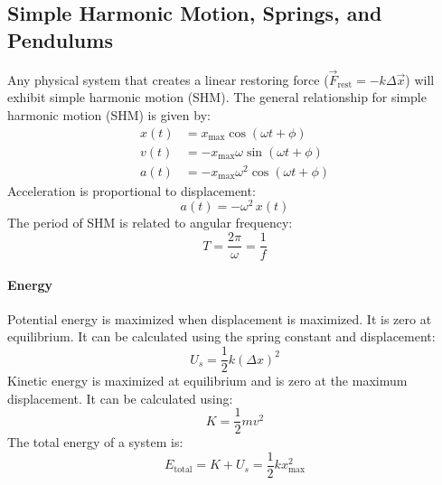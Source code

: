 \documentclass{article}
\begin{document}
        \subsection{Simple Harmonic Motion, Springs, and Pendulums}
            Any physical system that creates a linear restoring force ($\vec{F}_\text{rest} = - k \Delta \vec{x}$) will exhibit simple harmonic motion (SHM). The general relationship for simple harmonic motion (SHM) is given by:
            \begin{align}
                x(t) &= x_\text{max} \cos \left( \omega t + \phi \right) \\
                v(t) &= - x_\text{max} \omega \sin \left( \omega t + \phi \right) \\
                a(t) &= - x_\text{max} \omega^2 \cos \left( \omega t + \phi \right)
            \end{align}
            Acceleration is proportional to displacement:
            \begin{equation}
                \label{eq:shm-a-x}
                a(t) = - \omega^2 \, x(t)
            \end{equation}
            The period of SHM is related to angular frequency:
            \begin{equation}
                \label{eq:shm-period}
                T = \frac{2 \pi}{\omega} = \frac{1}{f}
            \end{equation}

            \paragraph{Energy}
            Potential energy is maximized when displacement is maximized. It is zero at equilibrium. It can be calculated using the spring constant and displacement:
            \begin{equation}
                U_s = \frac{1}{2} k \left( \Delta x \right)^2
            \end{equation}
            Kinetic energy is maximized at equilibrium and is zero at the maximum displacement. It can be calculated using:
            \begin{equation}
                K = \frac{1}{2} m v^2
            \end{equation}
            The total energy of a system is:
            \begin{equation}
                E_\text{total} = K + U_s = \frac{1}{2} k x_\text{max}^2
            \end{equation}
\end{document}
